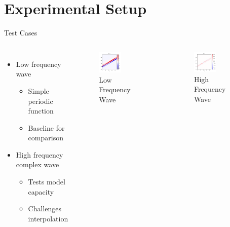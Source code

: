 \documentclass{beamer}
\begin{document}
\section{Experimental Setup}
\begin{frame}{Test Cases}
    \begin{columns}
        \begin{itemize}
            \item Low frequency wave
            \begin{itemize}
                \item Simple periodic function
                \item Baseline for comparison
            \end{itemize}
            \vspace{2cm}
            \item High frequency complex wave
            \begin{itemize}
                \item Tests model capacity
                \item Challenges interpolation
            \end{itemize}
        \end{itemize}
        
        \begin{figure}
            \includegraphics[width=0.5\textwidth]{low_frequency.png}
            \caption*{Low Frequency Wave}
        \end{figure}
        \vspace{0.3cm}
        \begin{figure}
            \includegraphics[width=0.5\textwidth]{high_frequency.png}
            \caption*{High Frequency Wave}
        \end{figure}
    \end{columns}
\end{frame}
\end{document}

